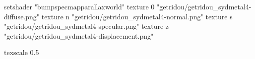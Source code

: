 setshader "bumpspecmapparallaxworld"
texture 0 "getridou/getridou_sydmetal4-diffuse.png"
texture n "getridou/getridou_sydmetal4-normal.png"
texture s "getridou/getridou_sydmetal4-specular.png"
texture z "getridou/getridou_sydmetal4-displacement.png"

texscale 0.5